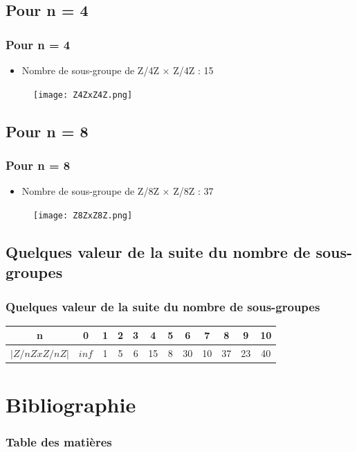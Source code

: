 \documentclass{beamer}
\begin{document}
\subsection{Pour n = 4}
\begin{frame}
\frametitle{Pour n = 4}
\begin{itemize}
    \item Nombre de sous-groupe de Z/4Z × Z/4Z : 15
\end{itemize}
\begin{figure}
  \centering
  \texttt{[image: Z4ZxZ4Z.png]}
\end{figure}

\end{frame}

\subsection{Pour n = 8}
\begin{frame}
\frametitle{Pour n = 8}
\begin{itemize}
    \item Nombre de sous-groupe de Z/8Z × Z/8Z : 37
\end{itemize}
\begin{figure}
  \centering
  \texttt{[image: Z8ZxZ8Z.png]}
\end{figure}
\end{frame}

\subsection{Quelques valeur de la suite du nombre de sous-groupes}
\begin{frame}
\frametitle{Quelques valeur de la suite du nombre de sous-groupes}

\begin{center}
    \begin{tabular}{|c|c|c|c|c|c|c|c|c|c|c|c|}
        \hline
        n       & 0     & 1 & 2 & 3 & 4  & 5 & 6  & 7  & 8  & 9  & 10 \tabularnewline
        \hline
        $| Z/nZxZ/nZ |$ & $inf$ & 1 & 5 & 6 & 15 & 8 & 30 & 10 & 37 & 23 & 40 \tabularnewline
        \hline
    \end{tabular}
\end{center}

\end{frame}

\section{Bibliographie}
\begin{frame}
\frametitle{Table des matières}
\tableofcontents[currentsection]
\end{frame}
\end{document}

